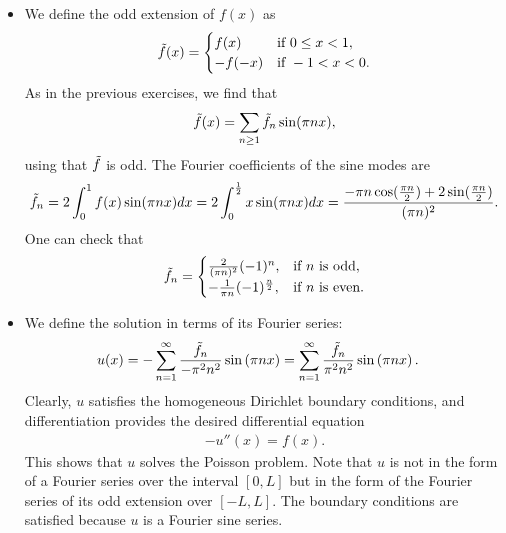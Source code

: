 \documentclass[11pt]{article}
\begin{document}
\begin{solution}
\begin{itemize}
    \item We define the odd extension of $f(x)$ as
    \begin{align*}
        \Tilde{f}(x) = \begin{cases}
            f(x) & \text{if } 0 \leq x < 1,\\
            -f(-x) & \text{if } -1 < x < 0.
        \end{cases}
    \end{align*}
    As in the previous exercises, we find that
    \begin{align*}
        \Tilde{f}(x) = \sum_{n \geq 1} \Tilde{f}_n \sin(\pi n x),
    \end{align*}
    using that $\Tilde f$ is odd. The Fourier coefficients of the sine modes are 
    \begin{align*}
        \Tilde{f}_n = 2 \int_0^1 f(x) \sin(\pi n x) dx = 2 \int_0^{\frac 1 2} x \sin(\pi n x) dx = \frac{- \pi n \cos (\frac{\pi n}{2}) + 2 \sin(\frac{\pi n}{2})}{(\pi n)^2}.
    \end{align*}
    One can check that 
    \begin{align*}
        \Tilde{f}_n = \begin{cases}
            \frac{2}{(\pi n)^2} (-1)^n, & \text{if } n \text{ is odd},\\
            -\frac{1}{\pi n}(-1)^{\frac n 2}, & \text{if } n \text{ is even}.
        \end{cases}
    \end{align*}
    \item 
    
    We define the solution in terms of its Fourier series:
    \begin{align}
        u(x) 
        &
        = 
        - \sum_{n=1}^{\infty} \frac{\Tilde{f}_n}{ -\pi^{2} n^{2} } \sin\left( \pi n x \right)
        = 
        \sum_{n=1}^{\infty} \frac{\Tilde{f}_n}{ \pi^{2} n^{2} } \sin\left( \pi n x \right)
        .
    \end{align}
    Clearly, $u$ satisfies the homogeneous Dirichlet boundary conditions,
    and differentiation provides the desired differential equation 
    \begin{align}
        - u''(x) = f(x).
    \end{align}
    This shows that $u$ solves the Poisson problem.
    Note that $u$ is not in the form of a Fourier series over the interval $[0, L]$ but in the form of the Fourier series of its odd extension over $[-L, L]$. 
    The boundary conditions are satisfied because $u$ is a Fourier sine series. 
    

\end{itemize}
\end{solution}
\end{document}
